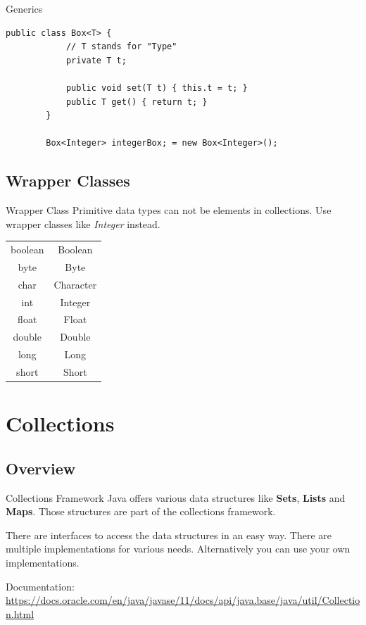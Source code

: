 \begin{frame}[fragile]{Generics}
	\begin{lstlisting}[basicstyle=\ttfamily\scriptsize]
		public class Box<T> {
		    // T stands for "Type"
		    private T t;

		    public void set(T t) { this.t = t; }
		    public T get() { return t; }
		}
		
		Box<Integer> integerBox; = new Box<Integer>();

	\end{lstlisting}
\end{frame}

\subsection{Wrapper Classes}

\begin{frame}{Wrapper Class}
	Primitive data types can not be elements in collections. 
	Use wrapper classes like \emph{Integer} instead.
	\begin{center}
		\begin{tabular}{ c  c }
			boolean & Boolean \\
			byte & Byte \\
			char & Character \\
			int & Integer \\
			float & Float \\
			double & Double \\
			long & Long \\
			short & Short
		\end{tabular}
	\end{center}
\end{frame}

\section{Collections}
\subsection{Overview}
\begin{frame}{Collections Framework}
	Java offers various data structures like \textbf{Sets}, \textbf{Lists} and \textbf{Maps}.
	Those structures are part of the collections framework.

	There are interfaces to access the data structures in an easy way.
	There are multiple implementations for various needs.
	Alternatively you can use your own implementations.
	
	Documentation: \url{https://docs.oracle.com/en/java/javase/11/docs/api/java.base/java/util/Collection.html}
\end{frame}

